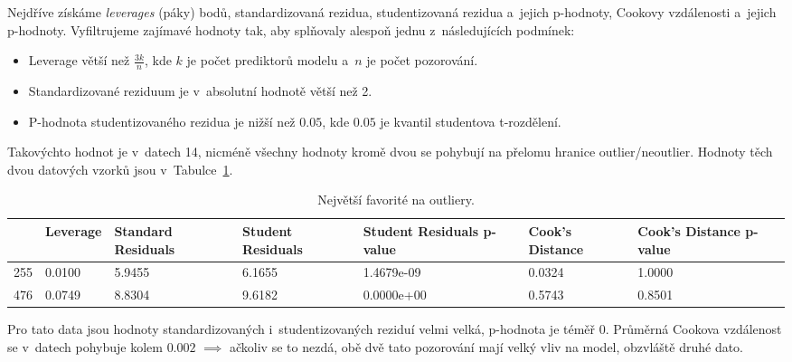 \documentclass[a4paper, 11pt]{article}
\begin{document}
Nejdříve získáme \emph{leverages} (páky) bodů, standardizovaná rezidua, studentizovaná rezidua a~jejich p-hodnoty, Cookovy vzdálenosti a~jejich p-hodnoty.
Vyfiltrujeme zajímavé hodnoty tak, aby splňovaly alespoň jednu z~následujících podmínek:
\begin{itemize}
    \item Leverage větší než $\frac{3k}{n}$, kde $k$ je počet prediktorů modelu a~$n$ je počet pozorování.
    \item Standardizované reziduum je v~absolutní hodnotě větší než 2.
    \item P-hodnota studentizovaného rezidua je nižší než $0.05$, kde $0.05$ je kvantil studentova t-rozdělení.
\end{itemize} 
Takovýchto hodnot je v~datech 14, nicméně všechny hodnoty kromě dvou se pohybují na přelomu hranice outlier/neoutlier.
Hodnoty těch dvou datových vzorků jsou v~Tabulce~\ref{tab:outliers}.
\begin{table}[ht]
    \centering
    \begin{tabularx}{\textwidth}{lXXXXXX}
        \toprule
        &\textbf{Leverage} & \textbf{Standard Residuals} & \textbf{Student Residuals} & \textbf{Student Residuals p-value} & \textbf{Cook's Distance} & \textbf{Cook's Distance p-value} \\
        \midrule
        255 & 0.0100 & 5.9455 & 6.1655 & 1.4679e-09 & 0.0324 & 1.0000 \\
        476 & 0.0749 & 8.8304 & 9.6182 & 0.0000e+00 & 0.5743 & 0.8501 \\
        \bottomrule
    \end{tabularx}
    \caption{Největší favorité na outliery.}
    \label{tab:outliers}
\end{table}
Pro tato data jsou hodnoty standardizovaných i~studentizovaných reziduí velmi velká, p-hodnota je téměř 0.
Průměrná Cookova vzdálenost se v~datech pohybuje kolem $0.002$ $\implies$ ačkoliv se to nezdá, obě dvě tato pozorování mají velký vliv na model, obzvláště druhé dato.
\end{document}
